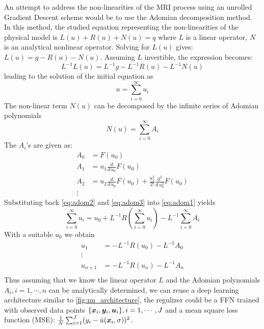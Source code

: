\documentclass{article}
\begin{document}
An attempt to address the non-linearities of the MRI process using an unrolled Gradient Descent scheme would be to use the Adomian decomposition method.
In this method, the studied equation representing the non-linearities of the physical model is $L(u) + R(u) + N(u)  = q$ where $L$ is a linear operator, $N$ is an analytical nonlinear operator. Solving for $L(u)$ gives: $L(u) = g - R(u) -N(u)$. Assuming $L$ invertible, the expression becomes:
\begin{equation}
	L^{-1} L (u) = L^{-1} g - L^{-1} R(u) - L^{-1} N(u) \label{eq:adom1}
\end{equation}
leading to the solution of the initial equation as
\begin{equation}
	u = \sum_{i=0}^\infty u_i \label{eq:adom2}
\end{equation}	
  The non-linear term $N(u)$ can be decomposed by the infinite series of Adomian polynomials
\begin{equation}
N(u) =  \sum_{i=0}^\infty A_i  \label{eq:adom3}
\end{equation}	
The $A_i$'s are given as:
\begin{align*}
	A_0	&=	F(u_0) \\
	A_1	&=	u_1 \frac{d}{d \, u_0} F(u_0) \\
	A_2	&=	u_2 \frac{d}{d \, u_0} F(u_0) + \frac{u_1^2}{2!}  \frac{d^2}{d \, u_0^2} F(u_0)  \\
	\vdots
\end{align*}
Substituting back \eqref{eq:adom2} and \eqref{eq:adom3} into \eqref{eq:adom1} yields
\begin{equation}
	 \sum_{i=0}^\infty u_i  =  u_0  + L^{-1} R( \sum_{i=0}^\infty u_i) -   L^{-1}    \sum_{i=0}^\infty  A_i \label{eq:adom4}
\end{equation}	
With a suitable $u_0$ we obtain
\begin{align*}
	u_1 			&=	-L^{-1} R(u_0) - L^{-1} A_0 \\
	\vdots \\
	u_{n+1} 		&=  -L^{-1} R(u_n) - L^{-1} A_n \\
\end{align*}
Thus assuming that we know the linear operator $L$ and  the Adomian polynomials $A_i, i=1,\cdots,n$ can be analytically determined, we can reuse a deep learning architecture similar to \ref{fig:nn_architecture}, the regulizer could be a FFN trained with observed data points $\{\bm{x}_i, \bm{y}_i, \bm{u}_i\}, i=1,\cdots,J$ and a mean square loss function (MSE): $\frac{1}{N} \sum_{i=1}^J (y_i - \hat{u}(\bm{x}_i, \sigma))^2$. 
\end{document}
